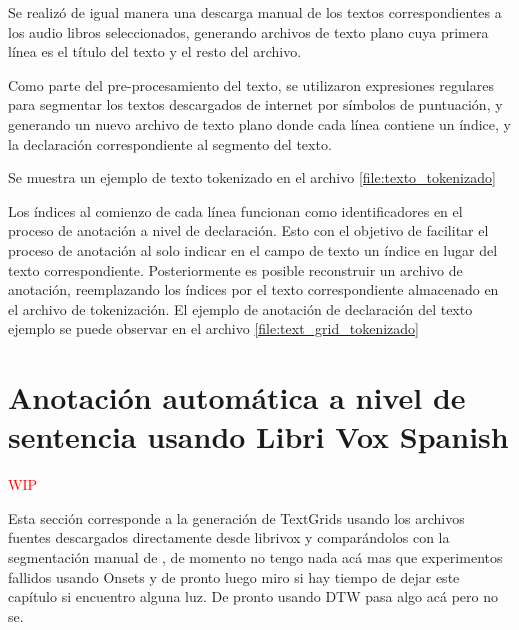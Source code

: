 Se realizó de igual manera una descarga manual de los textos correspondientes a los audio libros seleccionados, generando archivos de texto plano cuya primera línea es el título del texto y el resto del archivo. 

Como parte del pre-procesamiento del texto, se utilizaron expresiones regulares para segmentar los textos descargados de internet por símbolos de puntuación, y generando un nuevo archivo de texto plano donde cada línea contiene un índice, y la declaración correspondiente al segmento del texto.

Se muestra un ejemplo de texto tokenizado en el archivo \ref{file:texto_tokenizado}



Los índices al comienzo de cada línea funcionan como identificadores en el proceso de anotación a nivel de declaración. Esto con el objetivo de facilitar el proceso de anotación al solo indicar en el campo de texto un índice en lugar del texto correspondiente. Posteriormente es posible reconstruir un archivo de anotación, reemplazando los índices por el texto correspondiente almacenado en el archivo de tokenización. El ejemplo de anotación de declaración del texto ejemplo se puede observar en el archivo \ref{file:text_grid_tokenizado}




\section{Anotación automática a nivel de sentencia usando Libri Vox Spanish}

\textcolor{red}{WIP}

Esta sección corresponde a la generación de TextGrids usando los archivos fuentes descargados directamente desde librivox y comparándolos con la segmentación manual de \cite{LibriVox-Spanish}, de momento no tengo nada acá mas que experimentos fallidos usando Onsets y de pronto luego miro si hay tiempo de dejar este capítulo si encuentro alguna luz. De pronto usando DTW pasa algo acá pero no se.

